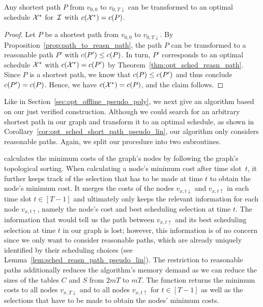 \begin{cor}\label{cor:opt_sched_short_path_pseudo_lin}
Any shortest path $P$ from $v_{0,0}$ to $v_{0,T\downarrow}$ can be transformed to an optimal schedule $\mathcal{X}^*$ for~$\mathcal{I}$ with $c(\mathcal{X}^*)=c(P)$.
\end{cor}
\begin{proof}
Let $P$ be a shortest path from $v_{0,0}$ to $v_{0,T\downarrow}$. By Proposition~\ref{prop:path_to_reasn_path}, the path $P$ can be transformed to a reasonable path $P'$ with $c(P')\le c(P)$.
In turn, $P'$ corresponds to an optimal schedule $\mathcal{X}^*$ with $c(\mathcal{X}^*)=c(P')$ by Theorem~\ref{thm:opt_sched_reasn_path}. Since $P$ is a shortest path, we know that $c(P)\le c(P')$ and thus conclude $c(P')=c(P)$. Hence, we have $c(\mathcal{X}^*)=c(P)$, and the claim follows.
\end{proof}
Like in Section~\ref{sec:opt_offline_pseudo_poly}, we next give an algorithm based on our just verified construction. Although we could search for an arbitrary shortest path in our graph and transform it to an optimal schedule, as shown in Corollary~\ref{cor:opt_sched_short_path_pseudo_lin}, our algorithm only considers reasonable paths. Again, we split our procedure into two subroutines.

 calculates the minimum costs of the graph's nodes by following the graph's topological sorting. When calculating a node's minimum cost after time slot~$t$, it further keeps track of the selection that has to be made at time $t$ to obtain the node's minimum cost. It merges the costs of the nodes $v_{x,t\downarrow}$ and $v_{x,t\uparrow}$ in each time slot $t\in[T-1]$ and ultimately only keeps the relevant information for each node $v_{x,t\uparrow}$, namely the node's cost and best scheduling selection at time $t$. The information that would tell us the path between $v_{x,t\uparrow}$ and its best scheduling selection at time $t$ in our graph is lost; however, this information is of no concern since we only want to consider reasonable paths, which are already uniquely identified by their scheduling choices (see Lemma~\ref{lem:sched_reasn_path_pseudo_lin}). The restriction to reasonable paths additionally reduces the algorithm's memory demand as we can reduce the sizes of the tables $C$ and $S$ from $2mT$ to $mT$. The function returns the minimum costs to all nodes $v_{x,T\downarrow}$ and to all nodes $v_{x,t\uparrow}$ for $t\in[T-1]$ as well as the selections that have to be made to obtain the nodes' minimum costs.


